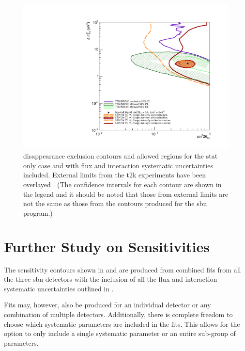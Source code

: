 \begin{figure}
    \centering
    \includegraphics[width = \largefigwidth]{figures-chap6/overlays/valor_overlays_nue_disapp.pdf}
    \caption[\nue disappearance contours with external limits.]{\nue disappearance exclusion contours and allowed regions for the stat only case and with flux and interaction systematic uncertainties included. External limits from the \gls{t2k} experiments have been overlayed \cite{T2K_nue_disapp_contour}. (The confidence intervals for each contour are shown in the legend and it should be noted that those from external limits are not the same as those from the contours produced for the \gls{sbn} program.)}
    \label{fig:nue_disapp_global_sensitivity}
\end{figure}


\clearpage
\section{Further Study on Sensitivities}

The sensitivity contours shown in  and  are produced from combined fits from all the three \gls{sbn} detectors with the inclusion of all the flux and interaction systematic uncertainties outlined in .

Fits may, however, also be produced for an individual detector or any combination of multiple detectors. Additionally, there is complete freedom to choose which systematic parameters are included in the fits. This allows for the option to only include a single systematic parameter or an entire sub-group of parameters. 

